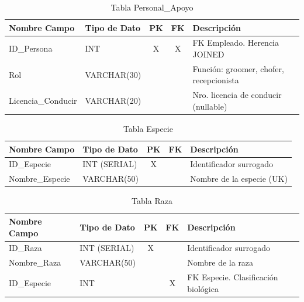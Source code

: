 \begin{table}[H]
\centering
\footnotesize
\begin{tabular}{|l|l|c|c|p{5cm}|}
\hline
\textbf{Nombre Campo} & \textbf{Tipo de Dato} & \textbf{PK} & \textbf{FK} & \textbf{Descripción} \\
\hline
ID\_Persona & INT & X & X & FK Empleado. Herencia JOINED \\
\hline
Rol & VARCHAR(30) & & & Función: groomer, chofer, recepcionista \\
\hline
Licencia\_Conducir & VARCHAR(20) & & & Nro. licencia de conducir (nullable) \\
\hline
\end{tabular}
\caption{Tabla Personal\_Apoyo}
\end{table}

\begin{table}[H]
\centering
\footnotesize
\begin{tabular}{|l|l|c|c|p{5cm}|}
\hline
\textbf{Nombre Campo} & \textbf{Tipo de Dato} & \textbf{PK} & \textbf{FK} & \textbf{Descripción} \\
\hline
ID\_Especie & INT (SERIAL) & X & & Identificador surrogado \\
\hline
Nombre\_Especie & VARCHAR(50) & & & Nombre de la especie (UK) \\
\hline
\end{tabular}
\caption{Tabla Especie}
\end{table}

\begin{table}[H]
\centering
\footnotesize
\begin{tabular}{|l|l|c|c|p{5cm}|}
\hline
\textbf{Nombre Campo} & \textbf{Tipo de Dato} & \textbf{PK} & \textbf{FK} & \textbf{Descripción} \\
\hline
ID\_Raza & INT (SERIAL) & X & & Identificador surrogado \\
\hline
Nombre\_Raza & VARCHAR(50) & & & Nombre de la raza \\
\hline
ID\_Especie & INT & & X & FK Especie. Clasificación biológica \\
\hline
\end{tabular}
\caption{Tabla Raza}
\end{table}

